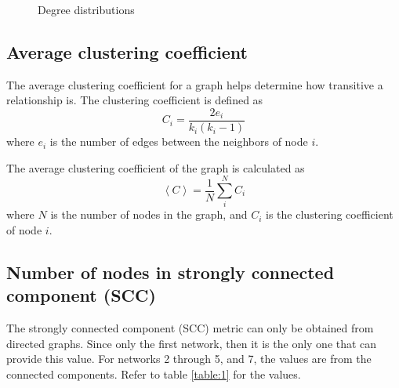 \begin{figure}
    \qquad
    \qquad
    \caption{Degree distributions}
    \label{fig:4}
\end{figure}

\subsection{Average clustering coefficient}
The average clustering coefficient for a graph helps determine how transitive a relationship is. The clustering coefficient is defined as
\begin{equation}
    C_i = \frac{2e_i}{k_i(k_i-1)}
    \label{equation:clustering_coef}
\end{equation}
where $e_i$ is the number of edges between the neighbors of node $i$.

The average clustering coefficient of the graph is calculated as
\begin{equation}
    \left\langle C \right\rangle = \frac{1}{N}\sum_{i}^{N}C_i
    \label{equation:avg_clustering_coef}
\end{equation}
where $N$ is the number of nodes in the graph, and $C_i$ is the clustering coefficient of node $i$.

\subsection{Number of nodes in strongly connected component (SCC)}
The strongly connected component (SCC) metric can only be obtained from directed graphs. Since only the first network, then it is the only one that can provide this value. For networks 2 through 5, and 7, the values are from the connected components. Refer to table \ref{table:1} for the values.

